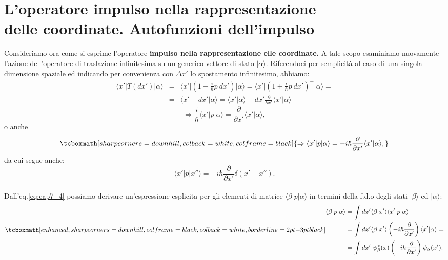 \section[L'operatore impulso nella rappresentazione delle coordinate. Autofunzioni dell'impulso]{L'operatore impulso nella rappresentazione \\delle coordinate. Autofunzioni dell'impulso}
Consideriamo ora come si esprime l'operatore \textbf{impulso nella rappresentazione elle coordinate.} A tale scopo esaminiamo nuovamente l'azione dell'operatore di traslazione infinitesima su un generico vettore di stato $\vert \alpha \rangle$. Riferendoci per semplicità al caso di una singola dimensione spaziale ed indicando per convenienza con $\Delta x'$ lo spostamento infinitesimo, abbiamo:
	\begin{eqnarray}
		\langle x' \vert T(dx') \vert \alpha \rangle 
		& = & \langle x' \vert \left(1-\frac{i}{\hbar}p\ dx'\right) \vert \alpha \rangle = \langle x' \vert \left(1+\frac{i}{\hbar}p\ dx'\right) ^+ \vert \alpha \rangle = \nonumber \\
		& = & \langle x'-dx'\vert \alpha \rangle = \langle x'\vert \alpha \rangle  - dx' \frac{\partial}{\partial x'} \langle x'\vert \alpha \rangle 
	\end{eqnarray}
	\begin{equation}
		 \Rightarrow \frac{i}{\hbar}\langle x'\vert p \vert \alpha \rangle = \frac{\partial}{\partial x'}\langle x'\vert \alpha \rangle ,
	\end{equation}
o anche
	\begin{equation}
		\label{eq:cap7_4}
		\tcboxmath[sharp corners=downhill, colback=white, colframe=black]{
			\Rightarrow \langle x'\vert p \vert \alpha \rangle =-i\hbar\frac{\partial}{\partial x'}\langle x'\vert \alpha \rangle ,
			}
	\end{equation}
da cui segue anche:
	\begin{equation}
		\langle x'\vert p \vert x'' \rangle =-i\hbar\frac{\partial}{\partial x'}\delta (x'-x'').
	\end{equation}\\
	
Dall'eq.\eqref{eq:cap7_4} possiamo derivare un'espressione esplicita per gli elementi di matrice $\langle \beta \vert p\vert \alpha \rangle $ in termini della f.d.o degli stati $\vert \beta \rangle $ ed $\vert \alpha \rangle $:
	\begin{equation}
		\label{eq:cap7_5}
		\tcboxmath[enhanced, sharp corners=downhill, colframe=black, colback=white, borderline={2pt}{-3pt}{black}]{
		\begin{aligned}
			\langle \beta \vert p \vert \alpha \rangle &= \int dx' \langle \beta \vert x' \rangle \langle x' \vert p \vert \alpha \rangle\\ &= \int dx' 	\langle \beta \vert x' \rangle \left( -i\hbar \frac{\partial}{\partial x'}\right) \langle x' \vert \alpha \rangle = \\
& = \int dx' \ \psi _{\beta} ^* (x) \left( -i\hbar \frac{\partial}{\partial x'}\right) \psi _{\alpha}  (x') .
		\end{aligned}
		}
	\end{equation}\\
	
